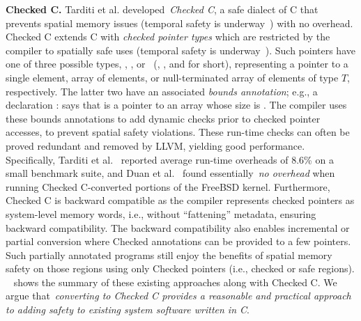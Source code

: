 \noindent
\textbf{Checked C.} Tarditi et al. developed~\emph{Checked C}, a safe dialect of C that prevents spatial memory issues (temporal safety is underway~\cite{checkedc:temporal}) with no overhead.
Checked C extends C with \emph{checked pointer
  types} which are restricted by the compiler to spatially safe uses (temporal safety is underway~\cite{checkedc:temporal}).
Such pointers have one of three possible types, , ,
or~ (\ptr, \arr, and \ntarr{} for short), representing a
pointer to a single element, array of elements, or null-terminated
array of elements of type $T$, respectively. The latter two have an
associated \emph{bounds annotation}; e.g., a declaration 
 :  says that  is a pointer to an  array whose size is .
The compiler uses these bounds annotations to add dynamic checks prior to checked pointer accesses, to prevent spatial safety violations.
These run-time checks can often be proved redundant and removed by LLVM, yielding good performance.
Specifically, Tarditi et al.~\cite{tarditi2018checked} reported average
run-time overheads of 8.6\% on a small benchmark suite, and
Duan et al.~\cite{duanrefactoring} found essentially~\emph{no overhead} when running
Checked C-converted portions of the FreeBSD kernel.
Furthermore, Checked C is backward compatible as the compiler  represents checked pointers as system-level memory words, i.e., without
``fattening'' metadata, ensuring backward compatibility. 
The backward compatibility also enables incremental or partial conversion where Checked annotations can be provided to a few pointers.
Such partially annotated programs still enjoy the benefits of spatial memory safety on those regions using only Checked pointers (i.e., checked or safe regions).
~ shows the summary of these existing approaches along with Checked C.
We argue that~\emph{converting to Checked C provides a reasonable and practical approach to adding safety to existing system software written in C}.




